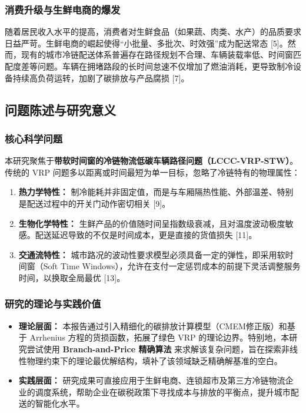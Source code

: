\documentclass[11pt, a4paper]{article}
\begin{document}
\subsubsection{消费升级与生鲜电商的爆发}
随着居民收入水平的提高，消费者对生鲜食品（如果蔬、肉类、水产）的品质要求日益严苛。生鲜电商的崛起使得“小批量、多批次、时效强”成为配送常态 [5]。然而，现有的城市冷链配送体系普遍存在路径规划不合理、车辆装载率低、时间窗匹配度差等问题。车辆在拥堵路段的长时间怠速不仅增加了燃油消耗，更导致制冷设备持续高负荷运转，加剧了碳排放与产品腐损 [7]。

\subsection{问题陈述与研究意义}

\subsubsection{核心科学问题}
本研究聚焦于\textbf{带软时间窗的冷链物流低碳车辆路径问题（LCCC-VRP-STW）}。传统的 VRP 问题多以距离或时间最短为单一目标，忽略了冷链特有的物理属性：

\begin{enumerate}
    \item \textbf{热力学特性：} 制冷能耗并非固定值，而是与车厢隔热性能、外部温差、特别是配送过程中的开关门动作密切相关 [9]。
    \item \textbf{生物化学特性：} 生鲜产品的价值随时间呈指数级衰减，且对温度波动极度敏感。配送延迟导致的不仅是时间成本，更是直接的货值损失 [11]。
    \item \textbf{交通流特性：} 城市路况的波动性要求模型必须具备一定的弹性，即采用软时间窗（Soft Time Windows），允许在支付一定惩罚成本的前提下灵活调整服务时间，以换取全局最优 [13]。
\end{enumerate}

\subsubsection{研究的理论与实践价值}
\begin{itemize}
    \item \textbf{理论层面：} 本报告通过引入精细化的碳排放计算模型（CMEM修正版）和基于 Arrhenius 方程的货损函数，拓展了绿色 VRP 的理论边界。特别地，本研究尝试使用 \textbf{Branch-and-Price 精确算法} 来求解该复杂问题，旨在探索非线性物理约束下的理论最优解结构，填补了该领域缺乏精确解基准的空白。
    \item \textbf{实践层面：} 研究成果可直接应用于生鲜电商、连锁超市及第三方冷链物流企业的调度系统，帮助企业在碳税政策下寻找成本与排放的平衡点，提升城市配送的智能化水平。
\end{itemize}
\end{document}

